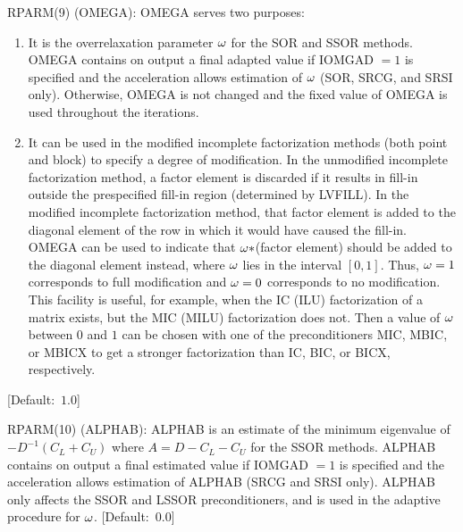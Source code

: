 \begin{list}{}{
               \leftmargin 1.00in \rightmargin 0.25in}
\item[RPARM(9) \hfill](OMEGA):
         OMEGA serves two purposes:
         \begin{enumerate}
          \item
          It is the overrelaxation parameter $\omega$ for the SOR
          and SSOR methods.  OMEGA contains on output a final
          adapted value if IOMGAD $= 1$ is specified and the
          acceleration allows estimation of $\omega$ (SOR, SRCG, and
          SRSI only).  Otherwise, OMEGA is not changed and the
          fixed value of OMEGA is used throughout the iterations.
          \item
          It can be used in the modified incomplete factorization
          methods (both point and block) to specify a degree of
          modification.  In the unmodified incomplete
          factorization method, a factor element is discarded
          if it results in fill-in outside the prespecified
          fill-in region (determined by LVFILL).  In the
          modified incomplete factorization method, that factor
          element is added to the diagonal element of the row
          in which it would have caused the fill-in.  OMEGA
          can be used to indicate that $\omega *$(factor element)
          should be added to the diagonal element instead, where
          $\omega$ lies in the interval $[0,1]$.  Thus, $\omega=1$
          corresponds
          to full modification and $\omega=0$ corresponds to no
          modification.  This facility is useful, for example,
          when the IC (ILU) factorization of a matrix exists,
          but the MIC (MILU) factorization does not.  Then a
          value of $\omega$ between $0$ and $1$ can be chosen
          with one
          of the preconditioners MIC, MBIC, or MBICX to get
          a stronger factorization than IC, BIC, or BICX,
          respectively.
         \end{enumerate}
         \mbox{[Default: $1.0$]}
 
\item[RPARM(10) \hfill](ALPHAB):
         ALPHAB is an estimate of the minimum eigenvalue of
         $-D^{-1}(C_L+C_U)$ where $A=D-C_L-C_U$ for the
         SSOR methods.  ALPHAB contains on output a final estimated
         value if IOMGAD $= 1$ is specified and the acceleration allows
         estimation of ALPHAB  (SRCG and SRSI only).  ALPHAB only
         affects the SSOR and LSSOR preconditioners, and is used in
         the adaptive procedure for $\omega$. \mbox{[Default: $0.0$]}
 

\end{list}

